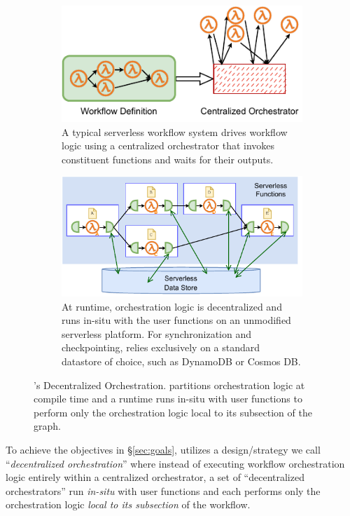\begin{figure}[t]
\begin{subfigure}[t]{0.8\textwidth}
	\end{subfigure}
	\begin{subfigure}[b]{\columnwidth}
		\centering
		\includegraphics[width=0.8\columnwidth]{figures/unum-arch-centralized.pdf}
		\caption{A typical serverless workflow system drives workflow logic
			using a centralized orchestrator that invokes constituent
			functions and waits for their outputs.}
		\label{fig:arch:centralized}
	\end{subfigure}
	\hfill
	\begin{subfigure}[b]{\columnwidth}
		\centering
		\includegraphics[width=.7\columnwidth]{figures/unum-arch-runtime.pdf}
		\caption{At runtime, \name{} orchestration logic is decentralized and
			runs in-situ with the user functions on an unmodified serverless
			platform. For synchronization and checkpointing,
			\name{} relies exclusively on a standard datastore of choice, such
			as DynamoDB or Cosmos DB.}
		\label{fig:arch:unum-runtime}
	\end{subfigure}
	\caption{\name{}'s Decentralized Orchestration. \name{} partitions
	orchestration logic at compile time and a \name{} runtime runs in-situ
	with user functions to perform only the orchestration logic local to its
	subsection of the graph.}
	\label{fig:arch}
\end{figure}

To achieve the objectives in \S\ref{sec:goals}, \name{} utilizes a
design/strategy we call ``\emph{decentralized orchestration}'' where instead
of executing workflow orchestration logic entirely within a centralized
orchestrator, a set of ``decentralized orchestrators'' run \emph{in-situ} with
user functions and each performs only the orchestration logic \emph{local to
its subsection} of the workflow.

